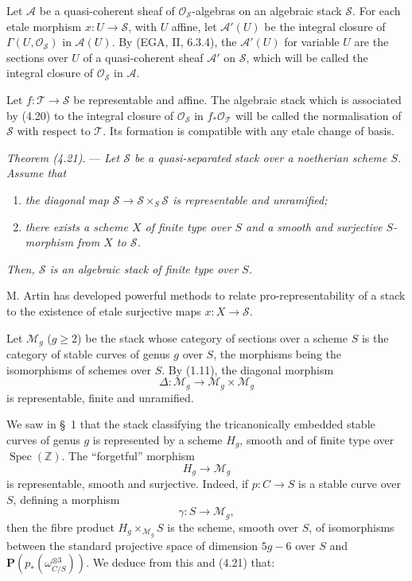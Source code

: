 \documentclass[10pt]{article}
\newcommand{\Spec}{\operatorname{Spec}}
\newcommand{\cO}{\mathcal O}
\newcommand{\PP}{\mathbf P}
\begin{document}
Let $\mathscr A$ be a quasi-coherent sheaf of $\cO_{\mathscr S}$-algebras on an algebraic stack $\mathscr S$. For each etale morphism $x:U\to\mathscr S$, with $U$ affine, let $\mathscr A'(U)$ be the integral closure of $\Gamma(U,\cO_{\mathscr S})$ in $\mathscr A(U)$. By (EGA, II, 6.3.4), the $\mathscr A'(U)$ for variable $U$ are the sections over $U$ of a quasi-coherent sheaf $\mathscr A'$ on $\mathscr S$, which will be called the integral closure of $\cO_{\mathscr S}$ in $\mathscr A$.

Let $f:\mathscr T\to\mathscr S$ be representable and affine. The algebraic stack which is associated by (4.20) to the integral closure of $\cO_{\mathscr S}$ in $f_*\cO_{\mathscr T}$ will be called the normalisation of $\mathscr S$ with respect to $\mathscr T$. Its formation is compatible with any etale change of basis.

\medskip
\noindent\emph{Theorem (4.21).} --- \emph{Let $\mathscr S$ be a quasi-separated stack over a noetherian scheme $S$. Assume that}
\begin{enumerate}[label=(\roman*)]
\item \emph{the diagonal map $\mathscr S\to\mathscr S\times_S\mathscr S$ is representable and unramified;}
\item \emph{there exists a scheme $X$ of finite type over $S$ and a smooth and surjective $S$-morphism from $X$ to $\mathscr S$.}
\end{enumerate}
\emph{Then, $\mathscr S$ is an algebraic stack of finite type over $S$.}

M. Artin has developed powerful methods to relate pro-representability of a stack to the existence of etale surjective maps $x:X\to\mathscr S$.

\medskip
{}

Let $\mathcal M_g$ ($g\geq 2$) be the stack whose category of sections over a scheme $S$ is the category of stable curves of genus $g$ over $S$, the morphisms being the isomorphisms of schemes over $S$. By (1.11), the diagonal morphism
\[
\Delta:\mathcal M_g\longrightarrow \mathcal M_g\times\mathcal M_g
\]
is representable, finite and unramified.

We saw in \S~1 that the stack classifying the tricanonically embedded stable curves of genus $g$ is represented by a scheme $H_g$, smooth and of finite type over $\Spec(\mathbb Z)$. The ``forgetful'' morphism
\[
H_g\longrightarrow \mathcal M_g
\]
is representable, smooth and surjective. Indeed, if $p:C\to S$ is a stable curve over $S$, defining a morphism
\[
\gamma:S\longrightarrow \mathcal M_g,
\]
then the fibre product $H_g\times_{\mathcal M_g}S$ is the scheme, smooth over $S$, of isomorphisms between the standard projective space of dimension $5g-6$ over $S$ and $\PP(p_*(\omega_{C/S}^{\otimes 3}))$. We deduce from this and (4.21) that:
\end{document}
